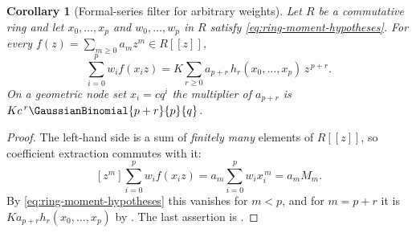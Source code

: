 \documentclass[11pt,a4paper,oneside,openany]{book}
\newtheorem{corollary}[corollary]{Corollary}
\theoremstyle{definition}
\theoremstyle{remark}
\begin{document}
\begin{corollary}[Formal-series filter for arbitrary weights]
\label{cor:ring-series-filter}
Let $R$ be a commutative ring and let $x_0,\ldots,x_p$ and $w_0,\ldots,w_p$ in
$R$ satisfy \eqref{eq:ring-moment-hypotheses}.  For every
$f(z)=\sum_{m\ge0}a_mz^m\in R[[z]]$,
\begin{equation}\label{eq:ring-series-filter}
 \sum_{i=0}^{p}w_if(x_iz)
 =K\sum_{r\ge0}a_{p+r}\,h_r(x_0,\ldots,x_p)\,z^{\,p+r}.
\end{equation}
On a geometric node set $x_i=cq^i$ the multiplier of $a_{p+r}$ is
$Kc^{\,r}\GaussianBinomial{p+r}{p}{q}$.
\end{corollary}

\begin{proof}
The left-hand side is a sum of \emph{finitely many} elements of $R[[z]]$, so
coefficient extraction commutes with it:
\[
 [z^m]\sum_{i=0}^{p}w_if(x_iz)
 =a_m\sum_{i=0}^{p}w_ix_i^{\,m}
 =a_mM_m.
\]
By \eqref{eq:ring-moment-hypotheses} this vanishes for $m<p$, and for $m=p+r$ it
is $Ka_{p+r}h_r(x_0,\ldots,x_p)$ by .  The last
assertion is .
\end{proof}
\end{document}
